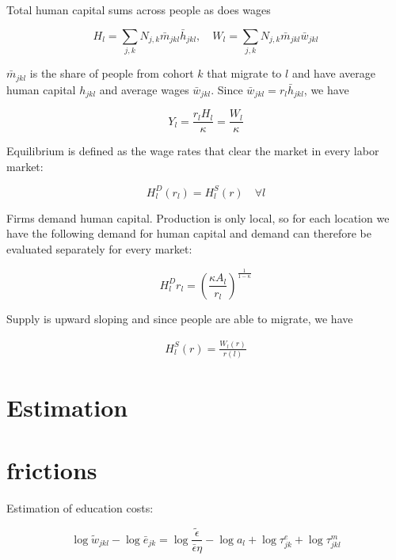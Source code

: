 \documentclass[12pt]{article}
\begin{document}
Total human capital sums across people as does wages

\begin{equation}
    H_l = \sum_{j,k} N_{j,k}\bar m_{jkl}\bar h_{jkl}, \quad W_l = \sum_{j,k} N_{j,k}\bar m_{jkl}\bar w_{jkl}
\end{equation}

$\bar m_{jkl}$ is the share of people from cohort $k$ that migrate to $l$ and have average human capital $h_{jkl}$ and average wages $\bar w_{jkl}$. Since $\bar w_{jkl} = r_l \bar h_{jkl}$, we have

\begin{equation}
    Y_l = \frac{r_lH_l}{\kappa} = \frac{W_l}{\kappa}
\end{equation}

Equilibrium is defined as the wage rates that clear the market in every labor market:

\begin{equation}
    H_l^D(r_l) = H_l^S(r) \quad \forall l
\end{equation}

Firms demand human capital. Production is only local, so for each location we have the following demand for human capital and demand can therefore be evaluated separately for every market:

\begin{equation}
    H_l^Dr_l = \left (\frac{\kappa A_l}{r_l} \right )^{\frac{1}{1-\kappa}}
\end{equation}

Supply is upward sloping and since people are able to migrate, we have 

\begin{align}
    H_l^S(r) = \frac{W_l(r)}{r(l)}
\end{align}

\section{Estimation}


\section{frictions}

Estimation of education costs:

\begin{equation}
    \log \tilde w_{jkl} - \log \bar e_{jk} = \log\frac{\tilde \epsilon}{\bar\epsilon \eta} - \log a_l + \log \tau_{jk}^e + \log \tau_{jkl}^m
\end{equation}
\end{document}
